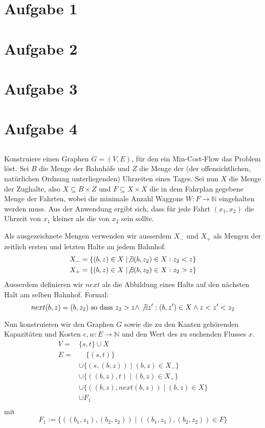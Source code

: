 \documentclass[a4paper]{article}
\begin{document}
\section{Aufgabe 1}

\section{Aufgabe 2}

\section{Aufgabe 3}

\section{Aufgabe 4}

\subsection*{}
Konstruiere einen Graphen $G = (V, E)$, für den ein Min-Cost-Flow das
Problem löst. Sei $B$ die Menge der Bahnhöfe und $Z$ die Menge der (der
offensichtlichen, natürlichen Ordnung unterliegenden) Uhrzeiten
eines Tages. Sei nun $X$ die Menge der Zughalte, also
$X \subseteq B \times Z$ und $F \subseteq X \times X$ die in dem Fahrplan 
gegebene Menge der Fahrten, wobei die minimale Anzahl Waggons
$W: F \rightarrow \mathbb{N}$ eingehalten werden muss.
Aus der
Anwendung ergibt sich, dass für jede Fahrt $(x_1, x_2)$ die Uhrzeit von
$x_1$ kleiner als die von $x_2$ sein sollte.

Als ausgezeichnete Mengen verwenden wir ausserdem $X_-$ und $X_+$ als Mengen
der zeitlich ersten und letzten Halte an jedem Bahnhof.
\begin{align*}
X_- &= \{ (b, z) \in X \mid \not\exists (b, z_2) \in X: z_2 < z \} \\
X_+ &= \{ (b, z) \in X \mid \not\exists (b, z_2) \in X: z_2 > z \} \\
\end{align*}
Ausserdem definieren wir $next$ als die Abbildung eines Halts auf den
nächsten Halt am selben Bahnhof. Formal:
\[
	next(b, z) = (b, z_2) \text{ so dass } z_2 > z 
		\wedge \not\exists z': (b, z') \in X \wedge z < z' < z_2
\] 

Nun konstruieren wir den Graphen $G$ sowie die zu den Kanten gehörenden
Kapazitäten und Kosten $c, w: E \rightarrow \mathbb{N}$ und den Wert des zu suchenden
Flusses $x$.
\begin{align*}
V = & \{s, t\} \cup X \\
E = & \quad \{ (s, t) \} \\
	& \cup \{ (s, (b, z)) \mid (b, z) \in X_- \} \\
	& \cup \{ ((b, z), t) \mid (b, z) \in X_+ \} \\
	& \cup \{ ((b, z), next(b, z)) \mid (b, z) \in X \} \\
	& \cup F_1 \\
\end{align*}
mit
\[
	F_1:=\{ ((b_1, z_1), (b_2, z_2)) \mid ((b_1, z_1), (b_2, z_2)) \in F \}
\]
\end{document}

